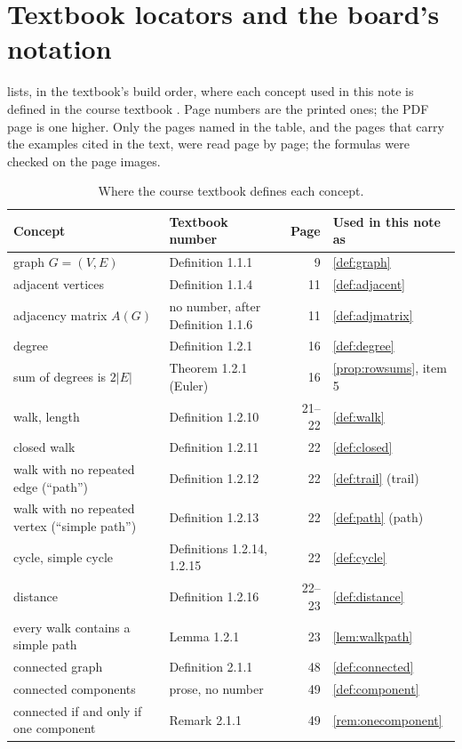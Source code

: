 \section{Textbook locators and the board's notation}\label{app:courseterms}

 lists, in the textbook's build order, where each concept used in this note is defined in the course textbook \cite{petrosyan2015grafneri}.
Page numbers are the printed ones; the PDF page is one higher.
Only the pages named in the table, and the pages that carry the examples cited in the text, were read page by page; the formulas were checked on the page images.

\begin{table}[ht]
\centering
\caption{Where the course textbook defines each concept.}\label{tab:locators}
\begin{tabular}{>{\raggedright\arraybackslash}p{4.4cm}>{\raggedright\arraybackslash}p{3.8cm}r>{\raggedright\arraybackslash}p{3.2cm}}
\toprule
Concept & Textbook number & Page & Used in this note as\\
\midrule
graph $G=(V,E)$ & Definition 1.1.1 & 9 & \cref{def:graph}\\
adjacent vertices & Definition 1.1.4 & 11 & \cref{def:adjacent}\\
adjacency matrix $A(G)$ & no number, after Definition 1.1.6 & 11 & \cref{def:adjmatrix}\\
degree & Definition 1.2.1 & 16 & \cref{def:degree}\\
sum of degrees is $2|E|$ & Theorem 1.2.1 (Euler) & 16 & \cref{prop:rowsums}, item 5\\
walk, length & Definition 1.2.10 & 21--22 & \cref{def:walk}\\
closed walk & Definition 1.2.11 & 22 & \cref{def:closed}\\
walk with no repeated edge (``path'') & Definition 1.2.12 & 22 & \cref{def:trail} (trail)\\
walk with no repeated vertex (``simple path'') & Definition 1.2.13 & 22 & \cref{def:path} (path)\\
cycle, simple cycle & Definitions 1.2.14, 1.2.15 & 22 & \cref{def:cycle}\\
distance & Definition 1.2.16 & 22--23 & \cref{def:distance}\\
every walk contains a simple path & Lemma 1.2.1 & 23 & \cref{lem:walkpath}\\
connected graph & Definition 2.1.1 & 48 & \cref{def:connected}\\
connected components & prose, no number & 49 & \cref{def:component}\\
connected if and only if one component & Remark 2.1.1 & 49 & \cref{rem:onecomponent}\\
\bottomrule
\end{tabular}
\end{table}

